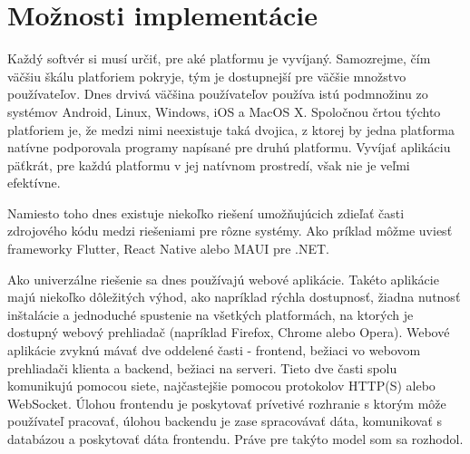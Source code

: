 \chapter{Možnosti implementácie}

\label{kap:moznosti_implementacie}

Každý softvér si musí určiť, pre aké platformu je vyvíjaný. Samozrejme, čím väčšiu škálu platforiem pokryje,
tým je dostupnejší pre väčšie množstvo používateľov. Dnes drvivá väčšina používateľov používa istú podmnožinu
zo systémov Android, Linux, Windows, iOS a MacOS X. Spoločnou črtou týchto platforiem je, že medzi nimi neexistuje taká dvojica,
z ktorej by jedna platforma natívne podporovala programy napísané pre druhú platformu. Vyvíjať aplikáciu päťkrát,
pre každú platformu v jej natívnom prostredí, však nie je veľmi efektívne. 

Namiesto toho dnes existuje niekoľko riešení umožňujúcich zdieľať časti zdrojového kódu medzi riešeniami pre rôzne systémy.
Ako príklad môžme uviesť frameworky Flutter, React Native alebo MAUI pre .NET.

Ako univerzálne riešenie sa dnes používajú webové aplikácie.
Takéto aplikácie majú niekoľko dôležitých výhod, ako napríklad rýchla dostupnosť, žiadna nutnosť inštalácie a jednoduché spustenie
na všetkých platformách, na ktorých je dostupný webový prehliadač (napríklad Firefox, Chrome alebo Opera).
Webové aplikácie zvyknú mávať dve oddelené časti - frontend, bežiaci vo webovom prehliadači klienta a backend,
bežiaci na serveri. Tieto dve časti spolu komunikujú pomocou siete, najčastejšie pomocou protokolov HTTP(S) alebo WebSocket.
Úlohou frontendu je poskytovať prívetivé rozhranie s ktorým môže používateľ pracovať, úlohou backendu je zase spracovávať dáta,
komunikovať s databázou a poskytovať dáta frontendu. Práve pre takýto model som sa rozhodol.

